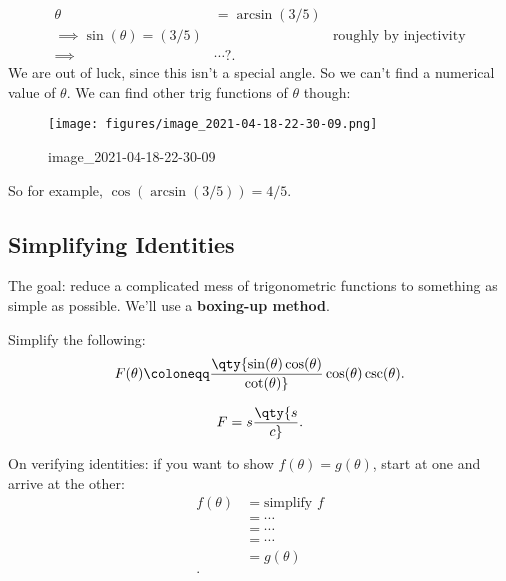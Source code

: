 \begin{solution}

\begin{align*}
\theta &= \arcsin(3/5) \\
\implies \sin(\theta) = (3/5) && \text{roughly by injectivity} \\
\implies &\cdots ?
.\end{align*}
We are out of luck, since this isn't a special angle. So we can't find a
numerical value of \(\theta\). We can find other trig functions of
\(\theta\) though:

\begin{figure}
\centering
\texttt{[image: figures/image\_2021-04-18-22-30-09.png]}
\caption{image\_2021-04-18-22-30-09}
\end{figure}

So for example, \(\cos(\arcsin(3/5)) = 4/5\).

\end{solution}

\hypertarget{simplifying-identities}{%
\subsection{Simplifying Identities}\label{simplifying-identities}}

\begin{remark}

The goal: reduce a complicated mess of trigonometric functions to
something as simple as possible. We'll use a \textbf{boxing-up method}.

\end{remark}

\begin{exercise}[?]

Simplify the following:
\begin{align*}
F(\theta) \coloneqq\qty{ \sin(\theta) \cos(\theta) \over \cot(\theta)} \cos(\theta)\csc(\theta)
.\end{align*}

\end{exercise}

\begin{solution}

\begin{align*}
F = s \qty{s \over c}
.\end{align*}

\end{solution}

\begin{remark}

On verifying identities: if you want to show \(f(\theta) = g(\theta)\),
start at one and arrive at the other:
\begin{align*}
f(\theta) &= \text{simplify } f \\
&= \cdots \\
&= \cdots \\
&= \cdots \\
&= g(\theta) \\
.\end{align*}

\end{remark}

